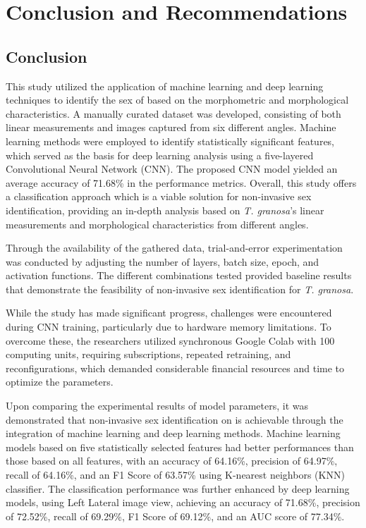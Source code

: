 \chapter{Conclusion and Recommendations}


\section{Conclusion}

This study utilized the application of machine learning and deep learning techniques to identify the sex of \Tgranosa based on the morphometric and morphological characteristics. A manually curated dataset was developed, consisting of both linear measurements and images captured from six different angles. Machine learning methods were employed to identify statistically significant features, which served as the basis for deep learning analysis using a five-layered Convolutional Neural Network (CNN). The proposed CNN model yielded an average accuracy of 71.68\% in the performance metrics. Overall, this study offers a classification approach which is a viable solution for non-invasive sex identification, providing an in-depth analysis based on \textit{T. granosa}’s linear measurements and morphological characteristics from different angles.

Through the availability of the gathered data, trial-and-error experimentation was conducted by adjusting the number of layers, batch size, epoch, and activation functions. The different combinations tested provided baseline results that demonstrate the feasibility of non-invasive sex identification for \textit{T. granosa}. 

While the study has made significant progress, challenges were encountered during CNN training, particularly due to hardware memory limitations. To overcome these, the researchers utilized synchronous Google Colab with 100 computing units, requiring subscriptions, repeated retraining, and reconfigurations, which demanded considerable financial resources and time to optimize the parameters. 

Upon comparing the experimental results of model parameters, it was demonstrated that non-invasive sex identification on \Tgranosa is achievable through the integration of machine learning and deep learning methods. Machine learning models based on five statistically selected features had better performances than those based on all features, with an accuracy of 64.16\%, precision of 64.97\%, recall of 64.16\%, and an F1 Score of 63.57\% using K-nearest neighbors (KNN) classifier. The classification performance was further enhanced by deep learning models, using Left Lateral image view, achieving an accuracy of 71.68\%, precision of 72.52\%, recall of 69.29\%, F1 Score of 69.12\%, and an AUC score of 77.34\%. 

